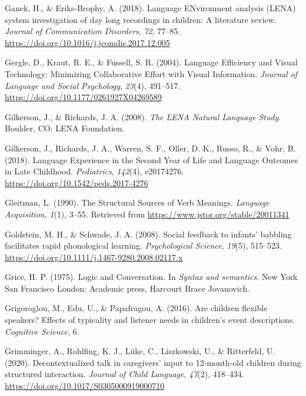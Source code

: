 \documentclass[
  man,floatsintext]{apa6}
\newlength{\cslhangindent}
\newlength{\cslentryspacingunit} %
\newenvironment{CSLReferences}[2] %
 {%
  \setlength{\parindent}{0pt}
  \ifodd #1
  \let\oldpar\par
  \def\par{\hangindent=\cslhangindent\oldpar}
  \fi
  \setlength{\parskip}{#2\cslentryspacingunit}
 }%
 {}
\begin{document}
\begin{CSLReferences}{1}{0}
\leavevmode{}%
Ganek, H., \& Eriks-Brophy, A. (2018). Language {ENvironment} analysis ({LENA}) system investigation of day long recordings in children: {A} literature review. \emph{Journal of Communication Disorders}, \emph{72}, 77--85. \url{https://doi.org/10.1016/j.jcomdis.2017.12.005}

\leavevmode{}%
Gergle, D., Kraut, R. E., \& Fussell, S. R. (2004). Language {Efficiency} and {Visual Technology}: {Minimizing Collaborative Effort} with {Visual Information}. \emph{Journal of Language and Social Psychology}, \emph{23}(4), 491--517. \url{https://doi.org/10.1177/0261927X04269589}

\leavevmode{}%
Gilkerson, J., \& Richards, J. A. (2008). \emph{The {LENA Natural Language Study}}. {Boulder, CO}: {LENA Foundation}.

\leavevmode{}%
Gilkerson, J., Richards, J. A., Warren, S. F., Oller, D. K., Russo, R., \& Vohr, B. (2018). Language {Experience} in the {Second Year} of {Life} and {Language Outcomes} in {Late Childhood}. \emph{Pediatrics}, \emph{142}(4), e20174276. \url{https://doi.org/10.1542/peds.2017-4276}

\leavevmode{}%
Gleitman, L. (1990). The {Structural Sources} of {Verb Meanings}. \emph{Language Acquisition}, \emph{1}(1), 3--55. Retrieved from \url{https://www.jstor.org/stable/20011341}

\leavevmode{}%
Goldstein, M. H., \& Schwade, J. A. (2008). Social feedback to infants' babbling facilitates rapid phonological learning. \emph{Psychological Science}, \emph{19}(5), 515--523. \url{https://doi.org/10.1111/j.1467-9280.2008.02117.x}

\leavevmode{}%
Grice, H. P. (1975). {Logic and Conversation}. In \emph{{Syntax and semantics}}. {New York San Francisco London}: {Academic press, Harcourt Brace Jovanovich}.

\leavevmode{}%
Grigoroglou, M., Edu, U., \& Papafragou, A. (2016). Are children flexible speakers? {Effects} of typicality and listener needs in children's event descriptions. \emph{Cognitive Science}, 6.

\leavevmode{}%
Grimminger, A., Rohlfing, K. J., Lüke, C., Liszkowski, U., \& Ritterfeld, U. (2020). Decontextualized talk in caregivers' input to 12-month-old children during structured interaction. \emph{Journal of Child Language}, \emph{47}(2), 418--434. \url{https://doi.org/10.1017/S0305000919000710}


\end{CSLReferences}
\end{document}

